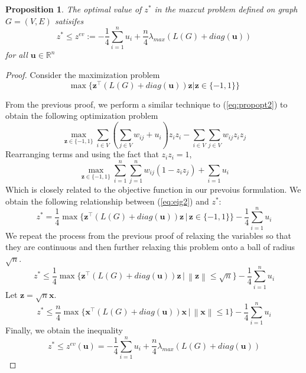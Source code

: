 \documentclass[12pt]{article}
\theoremstyle{plain}
\newtheorem{prop}{Proposition}
\theoremstyle{definition}
\newcommand{\norm}[1]{\left\lVert#1\right\rVert}
\begin{document}
\begin{prop}
    The optimal value of $z^*$ in the maxcut problem defined on graph $G=(V,E)$ satisifes
    \[
        z^* \leq z^{ev} := - \frac{1}{4}\sum_{i=1}^n u_i + \dfrac{n}{4} \lambda_{max}(L(G) + diag(\mathbf{u}))
    \]
    for all $\mathbf{u} \in \mathbb{R}^n$
\end{prop}

\begin{proof}
    Consider the maximization problem
    \begin{equation}\label{eq:propopt2}
        \max\lbrace \mathbf{z}^\top (L(G) + diag(\mathbf{u})) \mathbf{z} | \mathbf{z} \in \lbrace -1,1\rbrace \rbrace
    \end{equation}
   
    From the previous proof, we perform a similar technique to (\ref{eq:propopt2}) to obtain the following optimization problem 
    \[
    \max_{\mathbf{z} \in \lbrace -1,1 \rbrace} \sum_{i \in V}\left(\sum_{j \in V} w_{ij} + u_i \right) z_i z_i - \sum_{i \in V}\sum_{j \in V} w_{ij}z_i z_j
    \] 
    Rearranging terms and using the fact that $z_i z_i = 1$,
    \begin{equation}
        \max_{\mathbf{z} \in \lbrace -1, 1\rbrace} \sum_{i = 1}^n \sum_{j=1}^n w_{ij} (1 - z_i z_j) + \sum_{i = 1} u_i \label{eq:eig2}
    \end{equation}
    Which is closely related to the objective function in our prevoius formulation. We obtain the following relationship between (\ref{eq:eig2}) and $z^*$:
    \[
      z^* = \frac{1}{4} \max\lbrace \mathbf{z}^\top (L(G) + diag(\mathbf{u})) \mathbf{z} \,|\, \mathbf{z} \in \lbrace -1,1\rbrace \rbrace - \frac{1}{4}\sum_{i=1}^n u_i   
    \]
    We repeat the process from the previous proof of relaxing the variables so that they are continuous and then further relaxing this problem onto a ball of radius $\sqrt{n}$.
    \[
        z^* \leq \frac{1}{4} \max\lbrace \mathbf{z}^\top (L(G) + diag(\mathbf{u})) \mathbf{z} \,|\, \norm{\mathbf{z}} \leq \sqrt{n} \rbrace - \frac{1}{4}\sum_{i=1}^n u_i
    \]
    Let $\mathbf{z} = \sqrt{n} \mathbf{x}$. 
    \[
        z^* \leq \frac{n}{4} \max\lbrace \mathbf{x}^\top (L(G) + diag(\mathbf{u})) \mathbf{x} \,|\, \norm{\mathbf{x}} \leq 1\rbrace - \frac{1}{4}\sum_{i=1}^n u_i
    \]
    Finally, we obtain the inequality
    \begin{equation}
        z^* \leq z^{ev}(\mathbf{u}) = -\frac{1}{4}\sum_{i=1}^n u_i + \dfrac{n}{4} \lambda_{max}(L(G) + diag(\mathbf{u}))
    \end{equation}
\end{proof}
    
\end{document}
